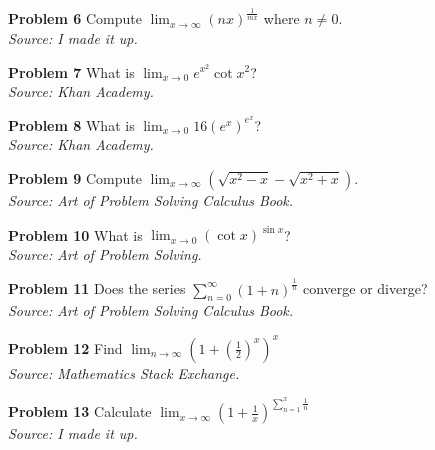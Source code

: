 \documentclass{article}
\begin{document}
\vspace{1cm}

\textbf{Problem 6} Compute $\displaystyle \lim_{x \rightarrow \infty} (nx)^{\frac{1}{mx}}$ where $n \neq 0.$\\
\textit{Source: I made it up.}

\vspace{1cm}

\textbf{Problem 7} What is $\displaystyle \lim_{x \to 0} e^{x^2} \cot{x^2}$?\\
\textit{Source: Khan Academy.}

\vspace{1cm}

\textbf{Problem 8} What is $\displaystyle \lim_{x \to 0} 16 \left( e^x \right)^{e^{x}} $?\\
\textit{Source: Khan Academy.}

\vspace{1cm}

\textbf{Problem 9} Compute $\displaystyle \lim_{x \rightarrow \infty} \left( \sqrt{x^2-x} - \sqrt{x^2+x} \right).$\\
\textit{Source: Art of Problem Solving Calculus Book.}

\vspace{1cm}

\textbf{Problem 10} What is $\displaystyle \lim_{x \to 0} \left( \cot{x} \right)^{\sin{x}}$?\\
\textit{Source: Art of Problem Solving.}

\vspace{1cm}

\textbf{Problem 11} Does the series $\displaystyle \sum_{n = 0}^{\infty} \left( 1 + n \right)^{\frac {1} {n}}$ converge or diverge?\\
\textit{Source: Art of Problem Solving Calculus Book.}

\vspace{1cm}

\textbf{Problem 12} Find $\displaystyle \lim_{n \to \infty} \left( 1 + \left( \frac {1} {2} \right)^{x}\right)^{x}$ \\
\textit{Source: Mathematics Stack Exchange.}

\vspace{1cm}


\textbf{Problem 13} Calculate $\displaystyle \lim_{x \to \infty} \left( 1 + \frac {1} {x} \right)^{\sum_{n = 1}^{x} \frac {1} {n}} $\\
\textit{Source: I made it up.}
\end{document}
